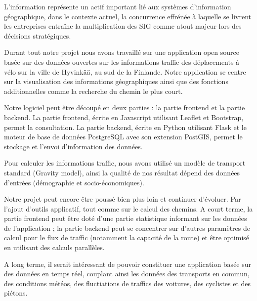 
L'information représente un actif important lié aux systèmes d'information géographique, dans le contexte actuel, la concurrence effrénée à laquelle se livrent les entreprises entraîne la multiplication des SIG comme atout majeur lors des décisions stratégiques.

Durant tout notre projet nous avons travaillé sur une application open source basée sur des données ouvertes sur les informations traffic des déplacements à vélo sur la ville de Hyvinkää, au sud de la Finlande. Notre application se centre sur la visualisation des informations géographiques ainsi que des fonctions additionnelles comme la recherche du chemin le plus court.

Notre logiciel peut être découpé en deux parties : la partie frontend et la partie backend. La partie frontend, écrite en Javascript utilisant Leaflet et Bootstrap, permet la consultation. La partie backend, écrite en Python utilisant Flask et le moteur de base de données PostgreSQL avec son extension PostGIS, permet le stockage et l'envoi d'information des données.

Pour calculer les informations traffic, nous avons utilisé un modèle de transport standard (Gravity model), ainsi la qualité de nos résultat dépend des données d'entrées (démographie et socio-économiques).

Notre projet peut encore être poussé bien plus loin et continuer d'évoluer. Par l'ajout d'outils applicatif, tout comme sur le calcul des chemins. A court terme, la partie frontend peut être doté d'une partie statistique informant sur les données de l'application ; la partie backend peut se concentrer sur d'autres paramètres de calcul pour le flux de traffic (notamment la capacité de la route) et être optimisé en utilisant des calculs parallèles.

A long terme, il serait intéressant de pouvoir constituer une application basée sur des données en temps réel, couplant ainsi les données des transports en commun, des conditions météos, des fluctiations de traffics des voitures, des cyclistes et des piétons.







